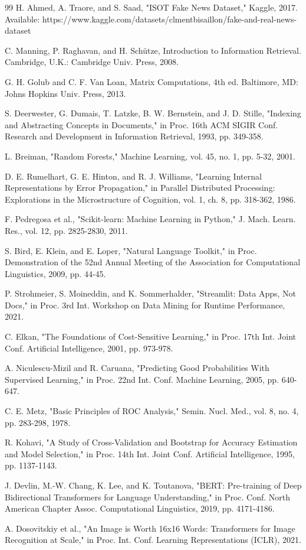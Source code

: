 \documentclass[conference,a4paper]{IEEEtran}
\begin{document}
\begin{thebibliography}{99}
\small
{}
H. Ahmed, A. Traore, and S. Saad, "ISOT Fake News Dataset," Kaggle, 2017. Available: https://www.kaggle.com/datasets/clmentbisaillon/fake-and-real-news-dataset

C. Manning, P. Raghavan, and H. Schütze, Introduction to Information Retrieval. Cambridge, U.K.: Cambridge Univ. Press, 2008.

G. H. Golub and C. F. Van Loan, Matrix Computations, 4th ed. Baltimore, MD: Johns Hopkins Univ. Press, 2013.

S. Deerwester, G. Dumais, T. Latzke, B. W. Bernstein, and J. D. Stille, "Indexing and Abstracting Concepts in Documents," in Proc. 16th ACM SIGIR Conf. Research and Development in Information Retrieval, 1993, pp. 349-358.

L. Breiman, "Random Forests," Machine Learning, vol. 45, no. 1, pp. 5-32, 2001.

D. E. Rumelhart, G. E. Hinton, and R. J. Williams, "Learning Internal Representations by Error Propagation," in Parallel Distributed Processing: Explorations in the Microstructure of Cognition, vol. 1, ch. 8, pp. 318-362, 1986.

F. Pedregosa et al., "Scikit-learn: Machine Learning in Python," J. Mach. Learn. Res., vol. 12, pp. 2825-2830, 2011.

S. Bird, E. Klein, and E. Loper, "Natural Language Toolkit," in Proc. Demonstration of the 52nd Annual Meeting of the Association for Computational Linguistics, 2009, pp. 44-45.

P. Strohmeier, S. Moineddin, and K. Sommerhalder, "Streamlit: Data Apps, Not Docs," in Proc. 3rd Int. Workshop on Data Mining for Runtime Performance, 2021.

C. Elkan, "The Foundations of Cost-Sensitive Learning," in Proc. 17th Int. Joint Conf. Artificial Intelligence, 2001, pp. 973-978.

A. Niculescu-Mizil and R. Caruana, "Predicting Good Probabilities With Supervised Learning," in Proc. 22nd Int. Conf. Machine Learning, 2005, pp. 640-647.

C. E. Metz, "Basic Principles of ROC Analysis," Semin. Nucl. Med., vol. 8, no. 4, pp. 283-298, 1978.

R. Kohavi, "A Study of Cross-Validation and Bootstrap for Accuracy Estimation and Model Selection," in Proc. 14th Int. Joint Conf. Artificial Intelligence, 1995, pp. 1137-1143.

J. Devlin, M.-W. Chang, K. Lee, and K. Toutanova, "BERT: Pre-training of Deep Bidirectional Transformers for Language Understanding," in Proc. Conf. North American Chapter Assoc. Computational Linguistics, 2019, pp. 4171-4186.

A. Dosovitskiy et al., "An Image is Worth 16x16 Words: Transformers for Image Recognition at Scale," in Proc. Int. Conf. Learning Representations (ICLR), 2021.

\end{thebibliography}
\end{document}
